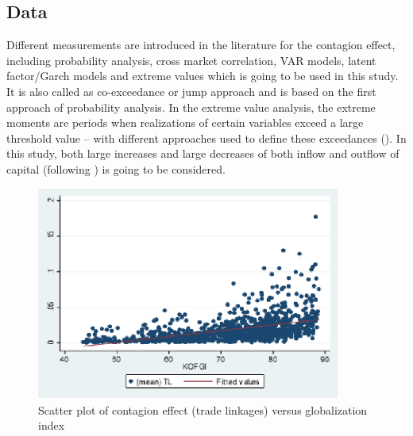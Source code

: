 \documentclass{article}
\begin{document}
\subsection*{Data} 
Different measurements are introduced in the literature for the contagion effect, including probability analysis, cross market correlation, VAR models, latent factor/Garch models and extreme values which is going to be used in this study. It is also called as co-exceedance or jump approach and is based on the first approach of probability analysis. In the extreme value analysis, the extreme moments are periods when realizations of certain variables exceed a large threshold value – with different approaches used to define these exceedances (\cite{forbes2012big}). In this study, both large increases and large decreases of both inflow and outflow of capital (following \cite{forbes2012capital}) is going to be considered. 
\begin{figure}
	\centering
	\includegraphics[width=10cm]{fig1.png}
	\caption{Scatter plot of contagion effect (trade linkages) versus globalization index }
	\label{fig:1}
\end{figure}


\end{document}

